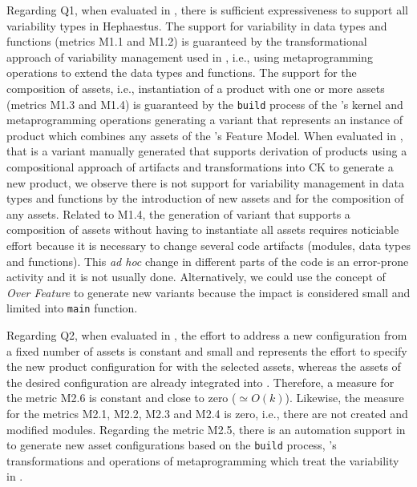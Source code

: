 Regarding Q1, when evaluated in \hpl{}, there is sufficient expressiveness to support all variability types in Hephaestus.
The support for variability in data types and functions (metrics M1.1 and M1.2) is guaranteed by the transformational approach of variability management used in \hpl{}, i.e., using metaprogramming operations 
to extend the data types and functions.
The support for the composition of assets, i.e., instantiation of a product with one or more assets (metrics M1.3 and M1.4) is guaranteed by the \texttt{build} process of the \hpl's kernel and metaprogramming operations generating a \hpl{} variant that represents an instance of product which combines any assets of the \hpl's Feature Model.
When evaluated in \hp{}, that is a variant manually generated that supports derivation of products using a compositional approach of artifacts and transformations into CK to generate a new product, we observe there is not support for variability management in data types and functions by the introduction of new assets and for the composition of any assets. 
Related to M1.4, the generation of \hp{} variant that supports a composition of assets without having to instantiate all assets requires noticiable effort because it is necessary to change several code artifacts (modules, data types and functions). 
This \textit{ad hoc} change in different parts of the code is an error-prone activity and it is not usually done. Alternatively, we could use the concept of \textit{Over Feature} to generate new \hp{} variants because the impact is considered small and limited into \texttt{main} function.


Regarding Q2, when evaluated in \hpl{}, the effort to address a new configuration from a fixed number of assets is constant and small and represents the effort to specify the new product configuration for \hpl{} with the selected assets, whereas the assets of the desired configuration are already integrated into \hpl. Therefore, a measure for the metric M2.6 is constant and close to zero ($\simeq O(k)$). Likewise, the measure for the metrics M2.1, M2.2, M2.3 and M2.4 is zero, i.e., there are not created and modified modules. Regarding the metric M2.5, there is an automation support in \hpl{} to generate new asset configurations based on the \texttt{build} process, \hpl's transformations and operations of metaprogramming which treat the variability in \hpl.

